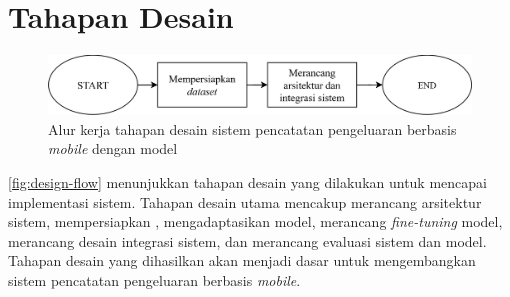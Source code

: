 \section{Tahapan Desain}
\label{sec:tahapan-desain}

\begin{figure}[htbp]
    \centering
    \includegraphics[width=1\textwidth]{images/design-flow.png}
    \caption{Alur kerja tahapan desain sistem pencatatan pengeluaran berbasis \emph{mobile} dengan model \donut}
    \label{fig:design-flow}
\end{figure}

\autoref{fig:design-flow} menunjukkan tahapan desain yang dilakukan untuk mencapai implementasi sistem. Tahapan desain utama mencakup merancang arsitektur sistem, mempersiapkan \dataset, mengadaptasikan model, merancang \emph{fine-tuning} model, merancang desain integrasi sistem, dan merancang evaluasi sistem dan model. Tahapan desain yang dihasilkan akan menjadi dasar untuk mengembangkan sistem pencatatan pengeluaran berbasis \emph{mobile}.



